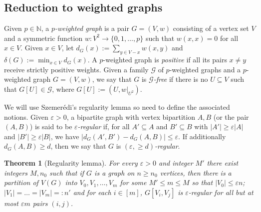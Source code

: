 \documentclass[11pt, a4paper]{article}
\newtheorem{theorem}{Theorem}[section]
\theoremstyle{definition}
\def\eps{{\varepsilon}}
\begin{document}




\subsection{Reduction to weighted graphs}\label{sec-reduction-weighted-graph}



Given $p\in\mathbb{N}$, a \emph{$p$-weighted graph} is a pair $G=(V,w)$ consisting of a vertex set $V$
and a symmetric function $w : V^2 \rightarrow \lbrace 0,1,\ldots, p\rbrace$ such that
$w(x,x)=0$ for all $x \in V$.
Given $x \in V$, let $d_G(x) := \sum_{y \in V-x}w(x,y)$ and $\delta(G) := \min_{x \in V}d_G(x)$. A $p$-weighted graph is \emph{positive} if all its pairs $x \neq y$ receive strictly positive weights.
Given a family $\mathcal{G}$ of $p$-weighted graphs and a $p$-weighted graph $G=(V,w)$, we say that $G$ is \emph{$\mathcal{G}$-free} if there is no $U \subseteq V$ such that $G[U] \in \mathcal{G}$, where
$G[U] := (U,w|_{U^2})$.

We will use Szemer\'edi's regularity lemma so need to define the associated notions.
Given $\eps>0$, a bipartite graph with vertex bipartition $A,B$ (or the pair $(A,B)$) is said to be \emph{$\eps$-regular} if, for all $A' \subseteq A$ and $B' \subseteq B$ with $|A'| \geq \eps|A|$ and $|B'| \geq \eps|B|$, we have $|d_G(A',B')-d_G(A,B)| \leq \eps$.
If additionally $d_G(A,B) \geq d$, then we say that $G$ is \emph{$(\eps,\geq\!d)$-regular}.



\begin{theorem}[Regularity lemma]\label{reg}
	For every $\eps>0$ and integer $M'$ there exist integers $M,n_0$ such that if $G$ is a graph on $n \geq n_0$ vertices, then there is a partition of $V(G)$ into $V_0,V_1,\ldots,V_m$ for some $M' \leq m \leq M$ so that $|V_0| \leq \eps n$; $|V_1|=\ldots=|V_m|=:n'$ and for each $i\in[m]$, $G[V_i,V_j]$ is $\eps$-regular for all but at most $\eps m$ pairs $(i,j)$.
\end{theorem}
\end{document}
